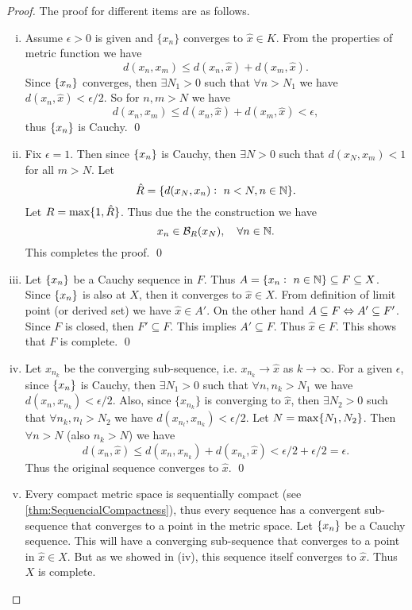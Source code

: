 \begin{proof}
	The proof for different items are as follows.
	\begin{enumerate}[(i)]
		\item Assume $\epsilon>0$ is given and $\{x_n\}$ converges to $\hat{x} \in K$. From the properties of metric function we have
		\[ d(x_n, x_m) \leq d(x_n,\hat{x}) + d(x_m,\hat{x}). \]
		Since $\{x_n\}$ converges, then $\exists N_1 > 0$ such that $\forall n > N_1$ we have $d(x_n,\hat{x}) < \epsilon/2$. So for $n,m > N$ we have
		\[  d(x_n, x_m) \leq d(x_n,\hat{x}) + d(x_m,\hat{x}) < \epsilon,\]
		thus $\{x_n\}$ is Cauchy. \qed
		
		\item Fix $\epsilon=1$. Then since $\{x_n\}$ is Cauchy, then $\exists N > 0$ such that $d(x_N, x_m) < 1 $ for all $m > N$. Let
		\[ \hat{R} = \{ d(x_N, x_n):\ n < N, n \in \mathbb{N} \}. \]
		Let $ R = \max\{1,\hat{R}\}$. Thus due the the construction we have
		\[ x_n \in \mathcal{B}_{R}(x_N), \quad \forall n \in \mathbb{N}. \]
		This completes the proof. \qed
		
		\item Let $\{x_n\}$ be a Cauchy sequence in $F$. Thus $A = \{x_n:\ n\in\mathbb{N} \} \subseteq F \subseteq X$. Since $\{x_n\}$ is also at $X$, then it converges to $\hat{x}\in X$. From definition of limit point (or derived set) we have $\hat{x} \in A'$. On the other hand $A \subseteq F \Leftrightarrow A' \subseteq F'$. Since $F$ is closed, then $F' \subseteq F$. This implies $A' \subseteq F$. Thus $\hat{x} \in F$. This shows that $F$ is complete.    \qed
		
		\item Let $x_{n_k}$ be the converging sub-sequence, i.e. $x_{n_k} \to \hat{x}$ as $k \to \infty$. For a given $\epsilon$, since $\{x_n\}$ is Cauchy, then $\exists N_1 > 0$ such that $\forall n,n_k > N_1$ we have $d(x_n, x_{n_k})<\epsilon/2$. Also, since $\{x_{n_k}\}$ is converging to $\hat{x}$, then $\exists N_2 > 0$ such that $\forall n_k, n_l > N_2$ we have $d(x_{n_l}, x_{n_k}) < \epsilon/2$. Let $N = \max\{N_1,N_2\}$. Then $\forall n > N$ (also $n_k > N$) we have
		\[ d(x_n, \hat{x}) \leq d(x_n, x_{n_k}) + d(x_{n_k},\hat{x}) < \epsilon/2 + \epsilon/2 = \epsilon.\]
 		Thus the original sequence converges to $\hat{x}$. \qed
 		
 		\item Every compact metric space is sequentially compact (see \autoref{thm:SequencialCompactness}), thus every sequence has a convergent sub-sequence that converges to a point in the metric space. Let $\{x_n\}$ be a Cauchy sequence. This will have a converging sub-sequence that converges to a point in $\hat{x} \in X$. But as we showed in (iv), this sequence itself converges to $\hat{x}$. Thus $X$ is complete.
	\end{enumerate}
\end{proof}


